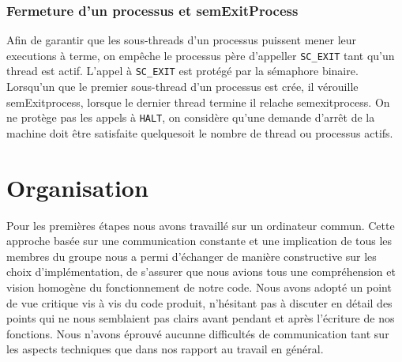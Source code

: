 \documentclass[11pt]{article}
\begin{document}
\subsubsection{Fermeture d'un processus et semExitProcess}
Afin de garantir que les sous-threads d'un processus puissent mener leur executions à terme, on empêche
le processus père d'appeller \texttt{SC\_EXIT} tant qu'un thread est actif. L'appel à \texttt{SC\_EXIT} est protégé par la sémaphore binaire.
Lorsqu'un que le premier sous-thread d'un processus est crée, il vérouille semExitprocess, lorsque le dernier thread termine
il relache semexitprocess.
On ne protège pas les appels à \texttt{HALT}, on considère qu'une demande d'arrêt de la machine doit être satisfaite quelquesoit
le nombre de thread ou processus actifs.









\section{Organisation}
Pour les premières étapes nous avons travaillé sur un ordinateur commun.
Cette approche basée sur une communication constante et une implication de tous les membres du groupe
nous a permi d'échanger de manière constructive sur les choix d'implémentation, de s'assurer que
nous avions tous une compréhension et vision homogène du fonctionnement de notre code. Nous
avons adopté un point de vue critique vis à vis du code produit,
n'hésitant pas à discuter en détail des points qui ne nous semblaient pas clairs
avant pendant et après l'écriture de nos fonctions. Nous n'avons éprouvé aucunne difficultés de communication
tant sur les aspects techniques que dans nos rapport au travail en général.
\end{document}
